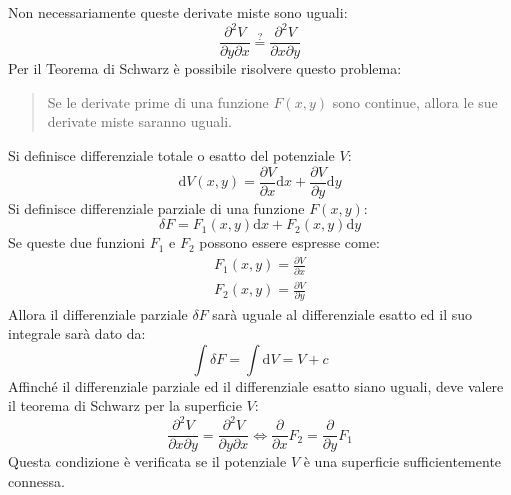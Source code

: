 \documentclass{article}
\newcommand{\df}{\mathrm{d}}
\numberwithin{equation}{subsection}
\begin{document}
Non necessariamente queste derivate miste sono uguali: 
\begin{equation*}
    \displaystyle\frac{\partial^{2} V}{\partial y\partial x}\stackrel{?}{=}\displaystyle\frac{\partial^{2} V}{\partial x\partial y}
\end{equation*}
Per il Teorema di Schwarz è possibile risolvere questo problema: 
\begin{quotation}
    Se le derivate prime di una funzione $F(x,y)$ sono continue, 
    allora le sue derivate miste saranno uguali.
\end{quotation}




Si definisce differenziale totale o esatto del potenziale $V$:
\begin{equation*}
    \df V(x,y)=\displaystyle\frac{\partial V}{\partial x}\df x+\frac{\partial V}{\partial y}\df y
\end{equation*}
Si definisce differenziale parziale di una funzione $F(x,y)$:
\begin{equation*}
    \delta F=F_1(x,y)\df x+F_2(x,y)\df y
\end{equation*}
Se queste due funzioni $F_1$ e $F_2$ possono essere espresse come:
\begin{gather*}
    F_1(x,y) = \displaystyle\frac{\partial V}{\partial x}\\ 
    F_2(x,y) = \displaystyle\frac{\partial V}{\partial y}
\end{gather*}
Allora il differenziale parziale $\delta F$ sarà uguale al 
differenziale esatto ed il suo integrale sarà dato da:
\begin{equation*}
    \displaystyle\int\delta F=\int \df V=V+c
\end{equation*}
Affinché il differenziale parziale ed il differenziale esatto 
siano uguali, deve valere il teorema di Schwarz per la superficie 
$V$:
\begin{equation*}
    \displaystyle\frac{\partial ^{2}V}{\partial x\partial y}=\frac{\partial ^{2}V}{\partial y\partial x}\iff \frac{\partial}{\partial x}F_2=\frac{\partial}{\partial y}F_1
\end{equation*}
Questa condizione è verificata se il potenziale $V$ è una 
superficie sufficientemente connessa. 
\end{document}
